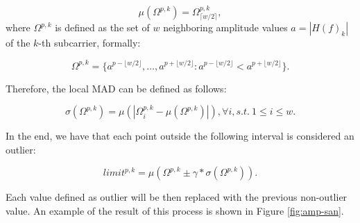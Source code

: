\documentclass[binding=0.6cm,noexaminfo]{sapthesis}
\begin{document}
\begin{equation}
\mu(\Omega^{p, k}) = \Omega^{p, k}_{\lceil w / 2\rceil},
\end{equation}
where $\Omega^{p, k}$ is defined as the set of $w$ neighboring amplitude values $a = |H(f)_k|$ of the $k$-th subcarrier, formally:

\begin{equation}
\Omega^{p, k} = \{ a^{p - \lfloor w / 2 \rfloor}, \dots, a^{p + \lfloor w / 2 \rfloor} : a^{p - \lfloor w / 2 \rfloor} < a^{p + \lfloor w / 2 \rfloor} \}.
\end{equation}

Therefore, the local MAD can be defined as follows:

\begin{equation}
\sigma(\Omega^{p, k}) = \mu \left( | \Omega^{p, k}_i - \mu ( \Omega^{p, k} ) | \right), \forall i, s.t. \: 1 \le i \le w.
\label{eq:local-mad}
\end{equation}

In the end, we have that each point outside the following interval is considered an outlier:

\begin{equation}
limit^{p, k} = \mu(\Omega^{p,k} \pm \gamma * \sigma(\Omega^{p,k})).
\end{equation}

Each value defined as outlier will be then replaced with the previous non-outlier value. An example of the result of this process is shown in Figure \ref{fig:amp-san}.
\end{document}

